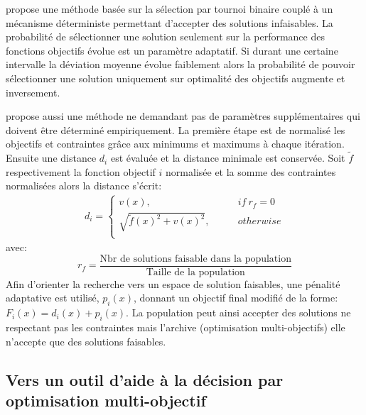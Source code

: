 \cite{EfrEnMezura-Montes2003} propose une méthode basée sur la sélection par tournoi binaire couplé à un mécanisme
déterministe permettant d’accepter des solutions infaisables. La probabilité de sélectionner une solution
seulement sur la performance des fonctions objectifs évolue est un paramètre adaptatif. Si durant une
certaine intervalle la déviation moyenne évolue faiblement alors la probabilité de pouvoir sélectionner
une solution uniquement sur optimalité des objectifs augmente et inversement.


\cite{Woldesenbet20073077} propose aussi une méthode ne demandant pas de paramètres supplémentaires
qui doivent être déterminé empiriquement. La première étape est de normalisé les objectifs et contraintes
grâce aux minimums et maximums à chaque itération. Ensuite une distance $d_{i}$ est
évaluée et la distance minimale est conservée. Soit $\tilde{f}$ respectivement la fonction objectif $i$ normalisée
et la somme des contraintes normalisées alors la distance s’écrit:
\begin{align}\label{eq:distance_measure}
    d_{i} = \begin{cases}
                v(x),                               \qquad & if\  r_{f} = 0\\
                \sqrt{\tilde{f}(x)^{2} + v(x)^{2}}, \qquad & otherwise\\
            \end{cases}
\end{align}
avec:
\begin{equation*}
    r_{f} = \frac{\text{Nbr de solutions faisable dans la population}}{\text{Taille de la population}}
\end{equation*}
Afin d’orienter la recherche vers un espace de solution faisables, une pénalité adaptative
est utilisé, $p_{i}(x)$, donnant un objectif final modifié de la forme: $F_{i}(x) = d_{i}(x) + p_{i}(x)$.
La population peut ainsi accepter des solutions ne respectant pas les contraintes mais
l’archive (optimisation multi-objectifs) elle n’accepte que des solutions faisables.


\subsection{Vers un outil d’aide à la décision par optimisation multi-objectif} %
\label{sub:vers_un_outil_d_aide_à_la_décision_par_optimisation_multi_objectif}

